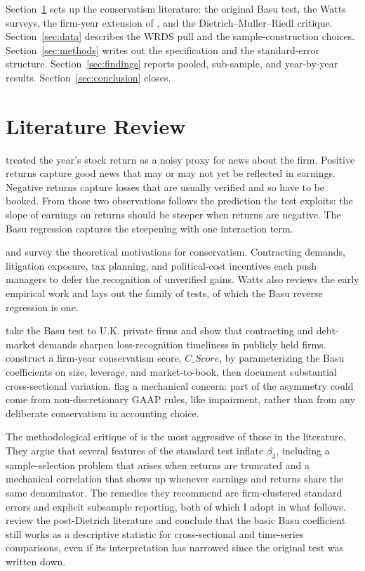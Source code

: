 \documentclass[12pt]{article}
\begin{document}
Section~\ref{sec:literature} sets up the conservatism literature: the original Basu test, the Watts surveys, the firm-year extension of \citet{khan2009}, and the Dietrich--Muller--Riedl critique. Section~\ref{sec:data} describes the WRDS pull and the sample-construction choices. Section~\ref{sec:methods} writes out the specification and the standard-error structure. Section~\ref{sec:findings} reports pooled, sub-sample, and year-by-year results. Section~\ref{sec:conclusion} closes.

\section{Literature Review}
\label{sec:literature}
\citet{basu1997} treated the year's stock return as a noisy proxy for news about the firm. Positive returns capture good news that may or may not yet be reflected in earnings. Negative returns capture losses that are usually verified and so have to be booked. From those two observations follows the prediction the test exploits: the slope of earnings on returns should be steeper when returns are negative. The Basu regression captures the steepening with one interaction term.

\citet{watts2003a} and \citet{watts2003b} survey the theoretical motivations for conservatism. Contracting demands, litigation exposure, tax planning, and political-cost incentives each push managers to defer the recognition of unverified gains. Watts also reviews the early empirical work and lays out the family of tests, of which the Basu reverse regression is one.

\citet{ball2005} take the Basu test to U.K. private firms and show that contracting and debt-market demands sharpen loss-recognition timeliness in publicly held firms. \citet{khan2009} construct a firm-year conservatism score, $\mathit{C\_Score}$, by parameterizing the Basu coefficients on size, leverage, and market-to-book, then document substantial cross-sectional variation. \citet{lawrence2013} flag a mechanical concern: part of the asymmetry could come from non-discretionary GAAP rules, like impairment, rather than from any deliberate conservatism in accounting choice.

The methodological critique of \citet{dietrich2007} is the most aggressive of those in the literature. They argue that several features of the standard test inflate $\beta_3$, including a sample-selection problem that arises when returns are truncated and a mechanical correlation that shows up whenever earnings and returns share the same denominator. The remedies they recommend are firm-clustered standard errors and explicit subsample reporting, both of which I adopt in what follows. \citet{ruch2015} review the post-Dietrich literature and conclude that the basic Basu coefficient still works as a descriptive statistic for cross-sectional and time-series comparisons, even if its interpretation has narrowed since the original test was written down.
\end{document}
